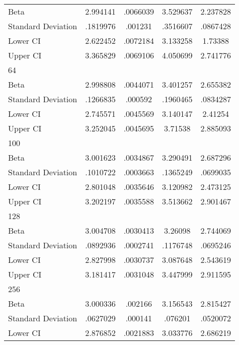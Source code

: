 {\begin{tabular}{l*{1}{cccc}}
Beta                &    2.994141&    .0066039&    3.529637&    2.237828\\
Standard Deviation  &    .1819976&     .001231&    .3516607&    .0867428\\
Lower CI            &    2.622452&    .0072184&    3.133258&     1.73388\\
Upper CI            &    3.365829&    .0069106&    4.050699&    2.741776\\
\hline
64                  &            &            &            &            \\
Beta                &    2.998808&    .0044071&    3.401257&    2.655382\\
Standard Deviation  &    .1266835&     .000592&    .1960465&    .0834287\\
Lower CI            &    2.745571&    .0045569&    3.140147&     2.41254\\
Upper CI            &    3.252045&    .0045695&     3.71538&    2.885093\\
\hline
100                 &            &            &            &            \\
Beta                &    3.001623&    .0034867&    3.290491&    2.687296\\
Standard Deviation  &    .1010722&    .0003663&    .1365249&    .0699035\\
Lower CI            &    2.801048&    .0035646&    3.120982&    2.473125\\
Upper CI            &    3.202197&    .0035588&    3.513662&    2.901467\\
\hline
128                 &            &            &            &            \\
Beta                &    3.004708&    .0030413&     3.26098&    2.744069\\
Standard Deviation  &    .0892936&    .0002741&    .1176748&    .0695246\\
Lower CI            &    2.827998&    .0030737&    3.087648&    2.543619\\
Upper CI            &    3.181417&    .0031048&    3.447999&    2.911595\\
\hline
256                 &            &            &            &            \\
Beta                &    3.000336&     .002166&    3.156543&    2.815427\\
Standard Deviation  &    .0627029&     .000141&     .076201&    .0520072\\
Lower CI            &    2.876852&    .0021883&    3.033776&    2.686219\\

\end{tabular}}
